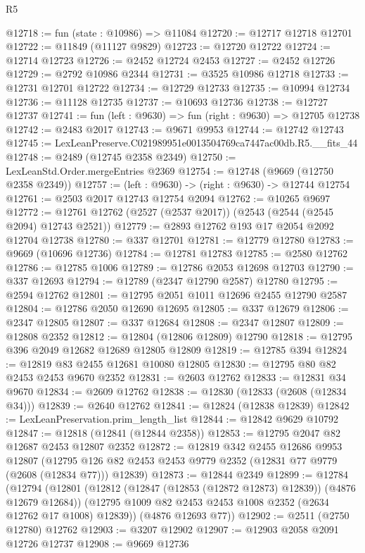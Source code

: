 \begin{lexlean}{R5}
\begin{coremodule}
@12718 := fun (state : @10986) => @11084
@12720 := @12717 @12718 @12701
@12722 := @11849 (@11127 @9829)
@12723 := @12720 @12722
@12724 := @12714 @12723
@12726 := @2452 @12724 @2453
@12727 := @2452 @12726
@12729 := @2792 @10986 @2344
@12731 := @3525 @10986 @12718
@12733 := @12731 @12701 @12722
@12734 := @12729 @12733
@12735 := @10994 @12734
@12736 := @11128 @12735
@12737 := @10693 @12736
@12738 := @12727 @12737
@12741 := fun (left : @9630) => fun (right : @9630) => @12705 @12738
@12742 := @2483 @2017
@12743 := @9671 @9953
@12744 := @12742 @12743
@12745 := LexLeanPreserve.C021989951e0013504769ca7447ac00db.R5.__fits_44
@12748 := @2489 (@12745 @2358 @2349)
@12750 := LexLeanStd.Order.mergeEntries @2369
@12754 := @12748 (@9669 (@12750 @2358 @2349))
@12757 := (left : @9630) -> (right : @9630) -> @12744 @12754
@12761 := @2503 @2017 @12743 @12754 @2094
@12762 := @10265 @9697
@12772 := @12761 @12762 (@2527 (@2537 @2017)) (@2543 (@2544 (@2545 @2094) @12743 @2521))
@12779 := @2893 @12762 @193 @17 @2054 @2092 @12704 @12738
@12780 := @337 @12701
@12781 := @12779 @12780
@12783 := @9669 (@10696 @12736)
@12784 := @12781 @12783
@12785 := @2580 @12762
@12786 := @12785 @1006
@12789 := @12786 @2053 @12698 @12703
@12790 := @337 @12693
@12794 := @12789 (@2347 @12790 @2587) @12780
@12795 := @2594 @12762
@12801 := @12795 @2051 @1011 @12696 @2455 @12790 @2587
@12804 := @12786 @2050 @12690 @12695
@12805 := @337 @12679
@12806 := @2347 @12805
@12807 := @337 @12684
@12808 := @2347 @12807
@12809 := @12808 @2352
@12812 := @12804 (@12806 @12809) @12790
@12818 := @12795 @396 @2049 @12682 @12689 @12805 @12809
@12819 := @12785 @394
@12824 := @12819 @83 @2455 @12681 @10080 @12805
@12830 := @12795 @80 @82 @2453 @2453 @9670 @2352
@12831 := @2603 @12762
@12833 := @12831 @34 @9670
@12834 := @2609 @12762
@12838 := @12830 (@12833 (@2608 (@12834 @34)))
@12839 := @2640 @12762
@12841 := @12824 (@12838 @12839)
@12842 := LexLeanPreservation.prim_length_list
@12844 := @12842 @9629 @10792
@12847 := @12818 (@12841 (@12844 @2358))
@12853 := @12795 @2047 @82 @12687 @2453 @12807 @2352
@12872 := @12819
    @342
    @2455
    @12686
    @9953
    @12807
    (@12795 @126 @82 @2453 @2453 @9779 @2352 (@12831 @77 @9779 (@2608 (@12834 @77))) @12839)
@12873 := @12844 @2349
@12899 := @12784
    (@12794
      (@12801
        (@12812 (@12847 (@12853 (@12872 @12873) @12839)) (@4876 @12679 @12684))
        (@12795 @1009 @82 @2453 @2453 @1008 @2352 (@2634 @12762 @17 @1008) @12839))
      (@4876 @12693 @77))
@12902 := @2511 (@2750 @12780) @12762
@12903 := @3207 @12902
@12907 := @12903 @2058 @2091 @12726 @12737
@12908 := @9669 @12736

\end{coremodule}
\end{lexlean}
